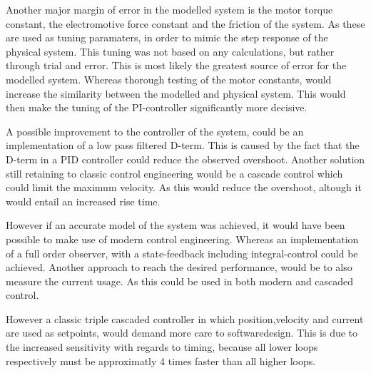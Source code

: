 \documentclass[../../Main]{subfiles}
\begin{document}
Another major margin of error in the modelled system is the motor torque constant, the electromotive force constant and the friction of the system. As these are used as tuning paramaters, in order to mimic the step response of the physical system. This tuning was not based on any calculations, but rather through trial and error.
This is most likely the greatest source of error for the modelled system. Whereas thorough testing of the motor constants, would increase the similarity between the modelled and physical system. This would then make the tuning of the PI-controller significantly more decisive.

A possible improvement to the controller of the system, could be an implementation of a low pass filtered D-term. This is caused by the fact that the D-term in a PID controller could reduce the observed overshoot.
Another solution still retaining to classic control engineering would be a cascade control which could limit the maximum velocity. As this would reduce the overshoot, altough it would entail an increased rise time.

However if an accurate model of the system was achieved, it would have been possible to make use of modern control engineering. Whereas an implementation of a full order observer, with a state-feedback including integral-control could be achieved.
Another approach to reach the desired performance, would be to also measure the current usage. As this could be used in both modern and cascaded control.

However a classic triple cascaded controller in which position,velocity and current are used as setpoints, would demand more care to softwaredesign. This is due to the increased sensitivity with regards to timing, because all lower loops respectively must be approximatly 4 times faster than all higher loops.
\end{document}
